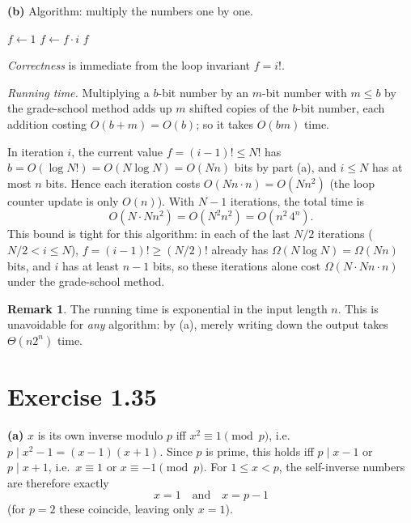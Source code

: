 \documentclass[11pt]{article}
\theoremstyle{definition}
\newtheorem*{remark}{Remark}
\begin{document}
\textbf{(b)} Algorithm: multiply the numbers one by one.

\begin{algorithm}[H]
\caption{Computing $N!$}
\begin{algorithmic}[1]
  \State $f\gets1$
    \State $f\gets f\cdot i$ 
  \EndFor
  \State \Return $f$
\EndFunction
\end{algorithmic}
\end{algorithm}

\emph{Correctness} is immediate from the loop invariant $f=i!$.

\emph{Running time.} Multiplying a $b$-bit number by an $m$-bit number with $m\le b$ by the
grade-school method adds up $m$ shifted copies of the $b$-bit number, each addition costing $O(b+m)=O(b)$;
so it takes $O(bm)$ time.

In iteration $i$, the current value $f=(i-1)!\le N!$ has $b=O(\log N!)=O(N\log N)=O(Nn)$ bits by part (a),
and $i\le N$ has at most $n$ bits. Hence each iteration costs $O(Nn\cdot n)=O(Nn^2)$ (the loop counter
update is only $O(n)$). With $N-1$ iterations, the total time is
\[
  O(N\cdot Nn^2)=O(N^2n^2)=\boxed{O(n^2\,4^n)}.
\]
This bound is tight for this algorithm: in each of the last $N/2$ iterations
($N/2 < i \le N$), $f=(i-1)!\ge (N/2)!$ already has $\Omega(N\log N)=\Omega(Nn)$ bits, and $i$ has at least
$n-1$ bits, so these iterations alone cost $\Omega(N\cdot Nn\cdot n)$ under the grade-school method.

\begin{remark}
The running time is exponential in the input length $n$. This is unavoidable for \emph{any} algorithm:
by (a), merely writing down the output takes $\Theta(n2^n)$ time.
\end{remark}

\section*{Exercise 1.35}

\textbf{(a)} $x$ is its own inverse modulo $p$ iff $x^2\equiv1\pmod p$, i.e.\ $p\mid x^2-1=(x-1)(x+1)$.
Since $p$ is prime, this holds iff $p\mid x-1$ or $p\mid x+1$, i.e.\ $x\equiv1$ or $x\equiv-1\pmod p$.
For $1\le x<p$, the self-inverse numbers are therefore exactly
\[
  x=1\quad\text{and}\quad x=p-1
\]
(for $p=2$ these coincide, leaving only $x=1$).
\end{document}
